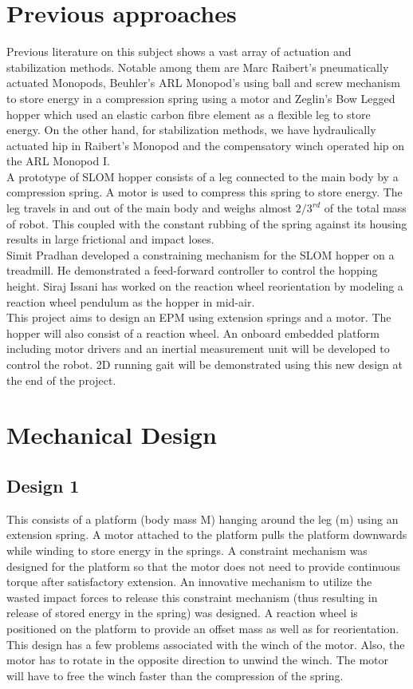\documentclass[10pt, compsocconf, conference]{IEEEtran}
\begin{document}
\section{Previous approaches}
Previous literature on this subject shows a vast array of actuation and stabilization methods. Notable among them are Marc Raibert's
pneumatically actuated Monopods, Beuhler's ARL Monopod's using ball and screw mechanism to store energy in a compression spring using
a motor and Zeglin's Bow Legged hopper which used an elastic carbon fibre element as a flexible leg to store energy.
On the other hand, for stabilization methods, we have hydraulically actuated hip in Raibert's Monopod and the compensatory winch
operated hip on the ARL Monopod I.\\

A prototype of SLOM hopper consists of a leg connected to the main body by a compression spring. A motor is used to compress
this spring to store
energy. The leg travels in and out of the main body and weighs almost $2/3^{rd}$ of the total mass of robot. This coupled with
the constant rubbing of the spring against its housing results in large frictional and impact loses.\\

Simit Pradhan developed a constraining mechanism for the SLOM hopper on a treadmill. He demonstrated a feed-forward controller
to control the hopping height. Siraj Issani has worked on the reaction wheel reorientation by modeling a reaction wheel
pendulum as the hopper in mid-air.\\

This project aims to design an EPM using extension springs and a motor. The hopper will also consist of a reaction wheel.
An onboard embedded platform including motor drivers and an inertial measurement unit will be developed to control the robot.
2D running gait will be demonstrated using this new design at the end of the project.\\

\section{Mechanical Design}
\subsection{Design 1}
This consists of a platform (body mass M) hanging around the leg (m) using an extension spring. A motor attached to the platform
pulls the platform downwards while winding to store energy in the springs. A constraint mechanism was designed for the platform
so that the motor does not need to provide continuous torque after satisfactory extension. An innovative mechanism to utilize
the wasted impact forces to release this constraint mechanism (thus resulting in release of stored energy in the spring) was
designed. A reaction wheel is positioned on the platform to provide an offset mass as well as for reorientation. This design has
a few problems associated with the winch of the motor. Also, the motor has to rotate in the opposite direction to unwind the winch.
The motor will have to free the winch faster than the compression of the spring.
\end{document}
